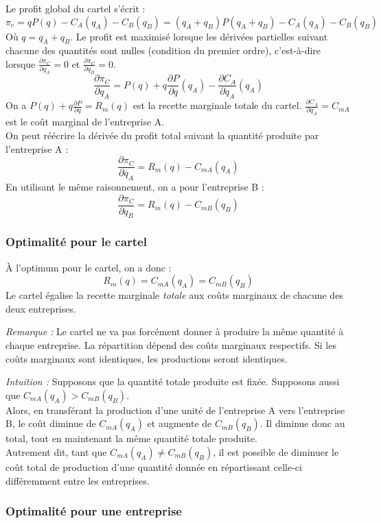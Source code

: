 \documentclass[
]{book}
\theoremstyle{definition}
\theoremstyle{definition}
\theoremstyle{definition}
\theoremstyle{definition}
\theoremstyle{remark}
\begin{document}
Le profit global du cartel s'écrit :
\[
\pi_c=qP(q)-C_A(q_A)-C_B(q_B)=(q_A+q_B)P(q_A+q_B)-C_A(q_A)-C_B(q_B)
\]
Où \(q=q_A+q_B\).
Le profit est maximisé lorsque les dérivées partielles suivant chacune des quantités sont nulles (condition du premier ordre), c'est-à-dire lorsque \(\frac{\partial\pi_C}{\partial q_A}=0\) et \(\frac{\partial\pi_C}{\partial q_B}=0\).
\[
\frac{\partial\pi_C}{\partial q_A} = P(q) + q\frac{\partial P}{\partial q}(q_A)-\frac{\partial C_A}{\partial q_A}(q_A)
\]
On a \(P(q) + q\frac{\partial P}{\partial q}=R_m(q)\) est la recette marginale totale du cartel.
\(\frac{\partial C_A}{\partial q_A}=C_{mA}\) est le coût marginal de l'entreprise A.\\
On peut réécrire la dérivée du profit total suivant la quantité produite par l'entreprise A :
\[
\frac{\partial\pi_C}{\partial q_A} = R_m(q)  - C_{mA}(q_A)
\]
En utilisant le même raisonnement, on a pour l'entreprise B :
\[
\frac{\partial\pi_C}{\partial q_B} = R_m(q)  - C_{mB}(q_B)
\]

\hypertarget{optimalituxe9-pour-le-cartel}{%
\subsubsection{Optimalité pour le cartel}\label{optimalituxe9-pour-le-cartel}}

À l'optimum pour le cartel, on a donc :
\[R_m(q) = C_{mA}(q_A) = C_{mB}(q_B)\]
Le cartel égalise la recette marginale \emph{totale} aux coûts marginaux de chacune des deux entreprises.

\emph{Remarque :} Le cartel ne va pas forcément donner à produire la même quantité à chaque entreprise.
La répartition dépend des coûts marginaux respectifs.
Si les coûts marginaux sont identiques, les productions seront identiques.

\emph{Intuition :} Supposons que la quantité totale produite est fixée.
Supposons aussi que \(C_{mA}(q_A)>C_{mB}(q_B)\).\\
Alors, en transférant la production d'une unité de l'entreprise A vers l'entreprise B, le coût diminue de \(C_{mA}(q_A)\) et augmente de \(C_{mB}(q_B)\).
Il diminue donc au total, tout en maintenant la même quantité totale produite.\\
Autrement dit, tant que \(C_{mA}(q_A)\neq C_{mB}(q_B)\), il est possible de diminuer le coût total de production d'une quantité donnée en répartissant celle-ci différemment entre les entreprises.

\hypertarget{optimalituxe9-pour-une-entreprise}{%
\subsubsection{Optimalité pour une entreprise}\label{optimalituxe9-pour-une-entreprise}}
\end{document}
